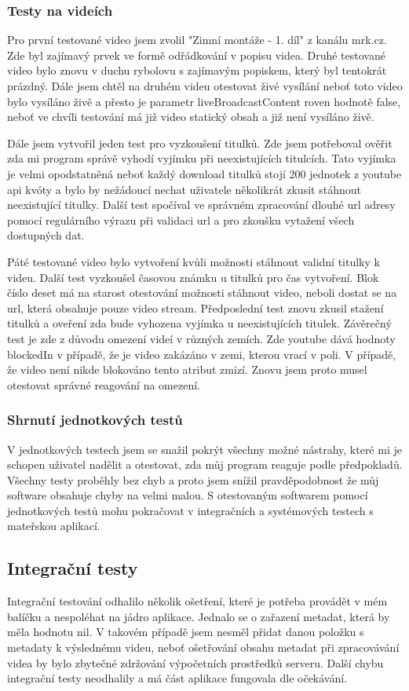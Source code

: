 \subsubsection{Testy na videích}
\par Pro první testované video jsem zvolil "Zimní montáže - 1. díl" z kanálu mrk.cz. Zde byl zajímavý prvek ve formě odřádkování v popisu videa. Druhé testované video bylo znovu v duchu rybolovu s zajímavým popiskem, který byl tentokrát prázdný. Dále jsem chtěl na druhém videu otestovat živé vysílání neboť toto video bylo vysíláno živě a přesto je parametr liveBroadcastContent roven hodnotě false, neboť ve chvíli testování má již video statický obsah a již není vysíláno živě.
\par Dále jsem vytvořil jeden test pro vyzkoušení titulků. Zde jsem potřeboval ověřit zda mi program správě vyhodí vyjímku při neexistujících titulcích. Tato vyjímka je velmi opodstatněná neboť každý download titulků stojí 200 jednotek z youtube api kvóty a bylo by nežádoucí nechat uživatele několikrát zkusit stáhnout neexistující titulky. Další test spočíval ve správném zpracování dlouhé url adresy pomocí regulárního výrazu při validaci url a pro zkoušku vytažení všech dostupných dat.
\par Páté testované video bylo vytvoření kvůli možnosti stáhnout validní titulky k videu. Další test vyzkoušel časovou známku u titulků pro čas vytvoření. Blok číslo deset má na starost otestování možnosti stáhnout video, neboli dostat se na url, která obsahuje pouze video stream. Předposlední test znovu zkusil stažení titulků a oveření zda bude vyhozena vyjímka u neexistujících titulek. Závěrečný test je zde z důvodu omezení videí v různých zemích. Zde youtube dává hodnoty blockedIn v případě, že je video zakázáno v zemi, kterou vrací v poli. V případě, že video není nikde blokováno tento atribut zmizí. Znovu jsem proto musel otestovat správné reagování na omezení.
\subsubsection{Shrnutí jednotkových testů}
\par V jednotkových testech jsem se snažil pokrýt všechny možné nástrahy, které mi je schopen uživatel nadělit a otestovat, zda můj program reaguje podle předpokladů. Všechny testy proběhly bez chyb a proto jsem snížil pravděpodobnost že můj software obsahuje chyby na velmi malou. S otestovaným softwarem pomocí jednotkových testů mohu pokračovat v integračních a systémových testech s mateřskou aplikací.
\subsection{Integrační testy}
\par Integrační testování odhalilo několik ošetření, které je potřeba provádět v mém balíčku a nespoléhat na jádro aplikace. Jednalo se o zařazení metadat, která by měla hodnotu nil. V takovém případě jsem nesměl přidat danou položku s metadaty k výslednému videu, neboť ošetřování obsahu metadat při zpracovávání videa by bylo zbytečné zdržování výpočetních prostředků serveru. Další chybu integrační testy neodhalily a má část aplikace fungovala dle očekávání.